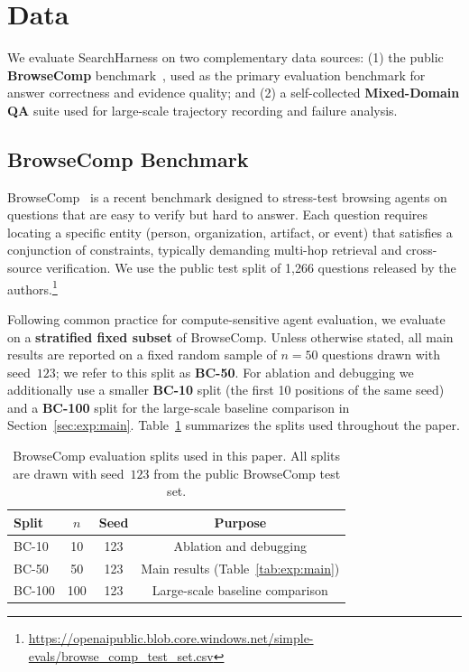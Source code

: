 
\section{Data}
\label{sec:data}

We evaluate SearchHarness on two complementary data sources:
(1) the public \textbf{BrowseComp} benchmark~\citep{wei2025browsecomp}, used as the primary evaluation benchmark for answer correctness and evidence quality; and
(2) a self-collected \textbf{Mixed-Domain QA} suite used for large-scale trajectory recording and failure analysis.

\subsection{BrowseComp Benchmark}
\label{sec:data:browsecomp}

BrowseComp~\citep{wei2025browsecomp} is a recent benchmark designed to stress-test browsing agents on questions that are easy to verify but hard to answer.
Each question requires locating a specific entity (person, organization, artifact, or event) that satisfies a conjunction of constraints, typically demanding multi-hop retrieval and cross-source verification.
We use the public test split of 1{,}266 questions released by the authors.\footnote{\url{https://openaipublic.blob.core.windows.net/simple-evals/browse_comp_test_set.csv}}

Following common practice for compute-sensitive agent evaluation, we evaluate on a \textbf{stratified fixed subset} of BrowseComp.
Unless otherwise stated, all main results are reported on a fixed random sample of $n=50$ questions drawn with seed~$123$; we refer to this split as \textbf{BC-50}.
For ablation and debugging we additionally use a smaller \textbf{BC-10} split (the first 10 positions of the same seed) and a \textbf{BC-100} split for the large-scale baseline comparison in Section~\ref{sec:exp:main}.
Table~\ref{tab:data:browsecomp} summarizes the splits used throughout the paper.

\begin{table}[t]
  \centering
  \small
  \begin{tabular}{lccc}
    \toprule
    Split & $n$ & Seed & Purpose \\
    \midrule
    BC-10  & 10  & 123 & Ablation and debugging \\
    BC-50  & 50  & 123 & Main results (Table~\ref{tab:exp:main}) \\
    BC-100 & 100 & 123 & Large-scale baseline comparison \\
    \bottomrule
  \end{tabular}
  \caption{BrowseComp evaluation splits used in this paper. All splits are drawn with seed~$123$ from the public BrowseComp test set.}
  \label{tab:data:browsecomp}
\end{table}

